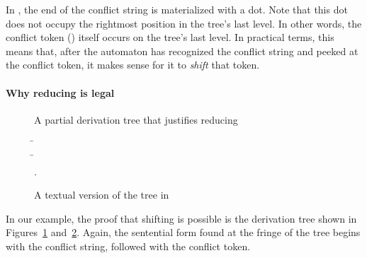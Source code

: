 \documentclass[onecolumn,11pt,nocopyrightspace,preprint]{sigplanconf}
\begin{document}
In , the end of the conflict string is materialized
with a dot. Note that this dot does not occupy the rightmost position in the
tree's last level. In other words, the conflict token () itself
occurs on the tree's last level. In practical terms, this means that, after
the automaton has recognized the conflict string and peeked at the conflict
token, it makes sense for it to \emph{shift} that token.

\paragraph{Why reducing is legal}

\begin{figure}
\mycommonbaseline
\begin{center}
\end{center}
\caption{A partial derivation tree that justifies reducing}
\label{fig:reducing:tree}
\end{figure}

\begin{figure}
\begin{center}
\begin{tabbing}
\=  \\
\>    \=   
                                                               \\
\>                                         \>     .
\end{tabbing}
\end{center}
\caption{A textual version of the tree in }
\label{fig:reducing:text}
\end{figure}

In our example, the proof that shifting is possible is the derivation tree
shown in Figures~\ref{fig:reducing:tree} and~\ref{fig:reducing:text}. Again,
the sentential form found at the fringe of the tree begins with the conflict
string, followed with the conflict token.
\end{document}
